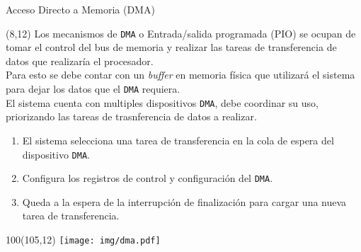 \documentclass[aspectratio=169]{beamer}
\begin{document}
\begin{frame}{Acceso Directo a Memoria (DMA)}
    \begin{textblock}{90}(8,12)
    \small
    Los mecanismos de \texttt{DMA} o Entrada/salida programada (PIO) se ocupan de tomar el control del bus de memoria y realizar las tareas de transferencia de datos que realizaría el procesador.\\
    \medskip
    Para esto se debe contar con un \emph{buffer} en memoria física que utilizará el sistema para dejar los datos que el \texttt{DMA} requiera.\\
    \medskip
    El sistema cuenta con multiples dispositivos \texttt{DMA}, debe coordinar su uso, priorizando las tareas de trasnferencia de datos a realizar.
    \begin{enumerate}
    \item El sistema selecciona una tarea de transferencia en la cola de espera del dispositivo \texttt{DMA}.
    \item Configura los registros de control y configuración del \texttt{DMA}.
    \item Queda a la espera de la interrupción de finalización para cargar una nueva tarea de transferencia.
    \end{enumerate}
    \end{textblock}
    \begin{textblock}{100}(105,12)
    \texttt{[image: img/dma.pdf]}
    \end{textblock}
\end{frame}
\end{document}

